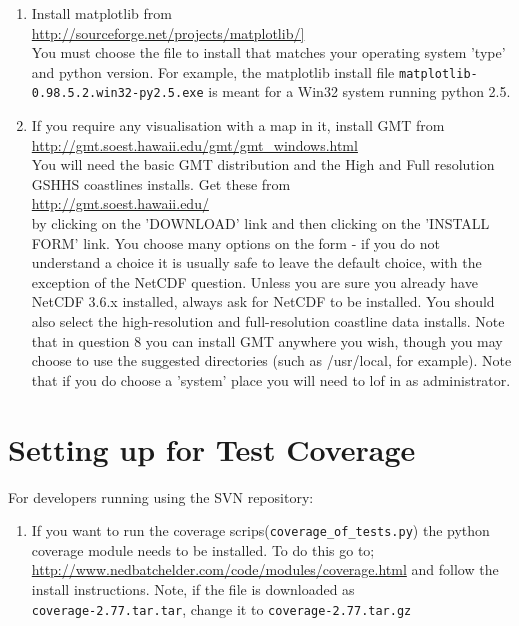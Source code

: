 \documentclass[a4paper, 12pt]{article}
\begin{document}
\begin{enumerate}
\item Install matplotlib from \\
\url{http://sourceforge.net/projects/matplotlib/]} \\
You must choose the file to install that matches your operating
system 'type' and python version. For example, the matplotlib
install file \texttt{matplotlib-0.98.5.2.win32-py2.5.exe} is meant
for a Win32 system running python 2.5.

\item If you require any visualisation with a map in it, install GMT
from \\
\url{http://gmt.soest.hawaii.edu/gmt/gmt_windows.html} \\
You will need the basic GMT distribution and the High and Full
resolution GSHHS coastlines installs.  Get these from \\
\url{http://gmt.soest.hawaii.edu/} \\
by clicking on the 'DOWNLOAD' link and then clicking on the 'INSTALL
FORM' link.  You choose many options on the form - if you do not
understand a choice it is usually safe to leave the default choice,
with the exception of the NetCDF question. Unless you are sure you
already have NetCDF 3.6.x installed, always ask for NetCDF to be
installed.  You should also select the high-resolution and
full-resolution coastline data installs. \vspace{1em} Note that in
question 8 you can install GMT anywhere you wish, though you may
choose to use the suggested directories (such as /usr/local, for
example). Note that if you do choose a 'system' place you will need
to lof in as administrator.

\end{enumerate}


\section{Setting up for Test Coverage} \label{sec:test-coverage}

For developers running using the SVN repository:
\begin{enumerate}
\item If you want to run the coverage scrips(\texttt{coverage\_of\_tests.py}) the
python coverage module needs to be installed.  To do this go to; \\
\url{http://www.nedbatchelder.com/code/modules/coverage.html} and
follow the install instructions. Note, if the file is downloaded as
\\ \texttt{coverage-2.77.tar.tar}, change it to
\texttt{coverage-2.77.tar.gz}
\end{enumerate}
\end{document}
